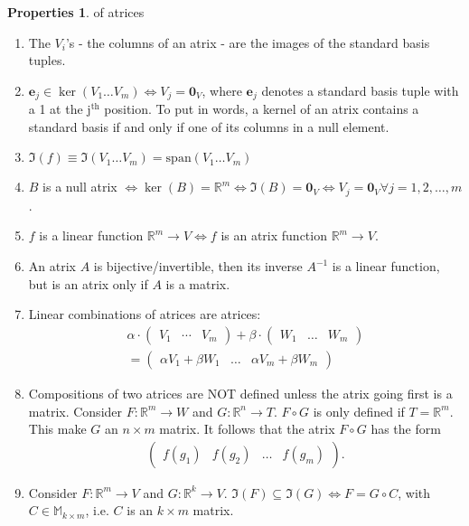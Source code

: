 \documentclass{article}
\theoremstyle{definition}
\newtheorem{prop}{Properties}[section]
\newcommand{\R}{\mathbb{R}}
\newcommand{\xpan}{\text{span}}
\begin{document}
\begin{prop} of atrices
	$\,$
	\begin{enumerate}
	\item The $V_i$'s - the columns of an atrix - are the images of the standard basis tuples. 
	\item $\mathbf{e}_j \in \ker(V_1\dots V_m) \iff V_j = \mathbf{0}_V$, where $\mathbf{e}_j$ denotes a standard basis tuple with a 1 at the j$^\text{th}$ position. To put in words, a kernel of an atrix contains a standard basis if and only if one of its columns in a null element. 
	\item $\Im(f) \equiv \Im(V_1\dots V_m) = \xpan(V_1\dots V_m)$
	\item $B$ is a null atrix $\iff \ker(B) = \R^m \iff \Im(B) = \mathbf{0}_V \iff V_j = \mathbf{0}_V \forall j=1,2,\dots,m$.
	\item  $f$ is a linear function $\R^m \rightarrow V \iff f$ is an atrix function $\R^m \rightarrow V$.
	\item An atrix $A$ is bijective/invertible, then its inverse $A^{-1}$ is a linear function, but is an atrix only if $A$ is a matrix. 
	\item Linear combinations of atrices are atrices:
	\begin{align*}
	\alpha \cdot\begin{pmatrix}
	V_1 & \cdots & V_m
	\end{pmatrix}
	+ 
	\beta \cdot \begin{pmatrix}
	W_1 & \dots & W_m
	\end{pmatrix}
	\\= \begin{pmatrix}
	\alpha V_1 + \beta W_1 &\dots& \alpha V_m + \beta W_m
	\end{pmatrix}
	\end{align*}  
	\item Compositions of two atrices are NOT defined unless the atrix going first is a matrix. Consider $F : \R^m \rightarrow W$ and $G : \R^n \rightarrow T$. $F\circ G$ is only defined if $T = \R^m$. This make $G$ an $n\times m$ matrix. It follows that the atrix $F\circ G$ has the form
	\begin{align*}
	\begin{pmatrix}
	f(g_1)&f(g_2)&\dots&f(g_m)
	\end{pmatrix}.
	\end{align*}
	\item Consider $F : \R^m \rightarrow V$ and $G : \R^k \rightarrow V$. $\Im(F) \subseteq \Im(G) \iff F = G \circ C$, with $C \in \mathbb{M}_{k\times m}$, i.e. $C$ is an $k \times m$ matrix. 

\end{enumerate}
\end{prop}
\end{document}
